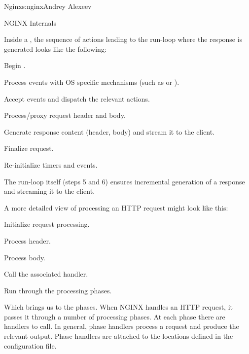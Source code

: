 \begin{aosachapter}{Nginx}{s:nginx}{Andrey Alexeev}
\begin{aosasect1}{NGINX Internals}
\begin{aosaitemize}
\end{aosaitemize}

Inside a , the sequence of actions leading to the
run-loop where the response is generated looks like the following:

\begin{aosaenumerate}

\item Begin .

\item Process events with OS specific mechanisms (such as 
  or ).

\item Accept events and dispatch the relevant actions.

\item Process/proxy request header and body.

\item Generate response content (header, body) and stream it to the
  client.

\item Finalize request.

\item Re-initialize timers and events.

\end{aosaenumerate}

The run-loop itself (steps 5 and 6) ensures incremental generation of
a response and streaming it to the client.


A more detailed view of processing an HTTP request might look like
this:

\begin{aosaenumerate}

\item Initialize request processing.

\item Process header.

\item Process body.

\item Call the associated handler.

\item Run through the processing phases.

\end{aosaenumerate}

Which brings us to the phases. When NGINX handles an HTTP request, it
passes it through a number of processing phases. At each phase there
are handlers to call. In general, phase handlers process a request and
produce the relevant output. Phase handlers are attached to the
locations defined in the configuration file.


\end{aosasect1}
\end{aosachapter}
